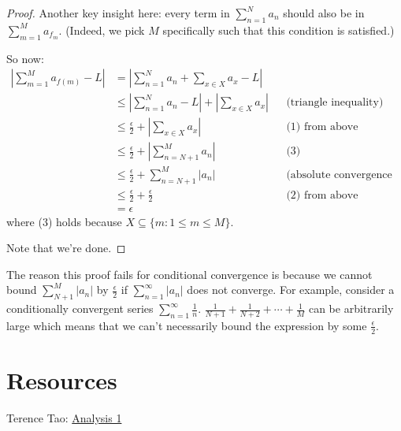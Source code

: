 \documentclass[answers,12pt]{exam}
\begin{document}
\begin{solution}
\begin{proof}
        Another key insight here:
        every term in $\sum_{n=1}^{N}a_n$ should also be in $\sum_{m=1}^{M} a_{f_m}$.
        (Indeed, we pick $M$ specifically such that this condition is satisfied.)

        So now:
        \begin{align*}
            \left | \sum_{m=1}^{M} a_{f(m)} - L \right | &= \left | \sum_{n=1}^{N} a_n + \sum_{x \in X} a_x - L \right | \\
            &\leq \left | \sum_{n=1}^{N} a_n -L \right | + \left | \sum_{x \in X} a_x \right | && \text{(triangle inequality)}\\
            &\leq \frac{\epsilon}{2} + \left | \sum_{x \in X} a_x \right | && \text{(1) from above} \\
            &\leq \frac{\epsilon}{2} + \left | \sum_{n=N+1}^{M} a_n \right | && \text{(3)}\\
            &\leq \frac{\epsilon}{2} + \sum_{n=N+1}^{M} \left | a_n \right | && \text{(absolute convergence test)}\\
            &\leq \frac{\epsilon}{2} + \frac{\epsilon}{2} && \text{(2) from above} \\
            &= \epsilon
        \end{align*}
        where (3) holds because $X \subseteq \{m: 1 \leq m \leq M \}$.

        Note that we're done.
    \end{proof}
    The reason this proof fails for conditional convergence is because we cannot bound $\sum_{N+1}^{M} |a_n|$ by $\frac{\epsilon}{2}$ if $\sum_{n=1}^{\infty} |a_n|$ does not converge.
    For example, consider a conditionally convergent series $\sum_{n=1}^{\infty} \frac{1}{n}$.
    $\frac{1}{N+1} + \frac{1}{N+2} + \cdots + \frac{1}{M}$ can be arbitrarily large which means that we can't necessarily bound the expression by some $\frac{\epsilon}{2}$.
\end{solution}

\section{Resources}
Terence Tao: \href{https://terrytao.wordpress.com/books/analysis-i/}{Analysis 1}
\end{document}
